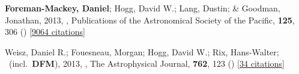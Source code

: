 \item[{\color{numcolor}\scriptsize2}] \textbf{Foreman-Mackey, Daniel}; Hogg, David W.; Lang, Dustin; \& Goodman, Jonathan, 2013, , Publications of the Astronomical Society of the Pacific, \textbf{125}, 306 () [\href{https://ui.adsabs.harvard.edu/abs/2013PASP..125..306F}{9064 citations}]

\item[{\color{numcolor}\scriptsize1}] Weisz, Daniel R.; Fouesneau, Morgan; Hogg, David W.; Rix, Hans-Walter; \etal\ (incl.\ \textbf{DFM}), 2013, , The Astrophysical Journal, \textbf{762}, 123 () [\href{https://ui.adsabs.harvard.edu/abs/2013ApJ...762..123W}{34 citations}]